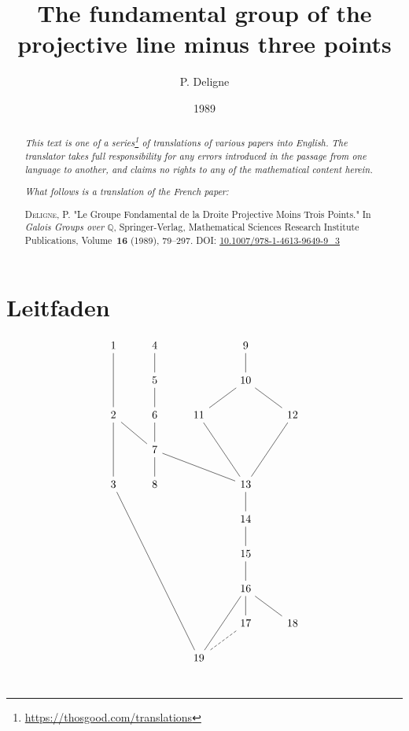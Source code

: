 \documentclass{article}
\title{The fundamental group of the projective line minus three points}
\author{P. Deligne}
\date{1989}
\newcommand{\doctype}{French paper}
\newcommand{\origcit}{%
  \textsc{Deligne, P.}
  "Le Groupe Fondamental de la Droite Projective Moins Trois Points."
  In \emph{Galois Groups over $\mathbb{Q}$}, Springer-Verlag, Mathematical Sciences Research Institute Publications, Volume~\textbf{16} (1989), 79--297.
  \textsc{DOI:} \href{https://doi.org/10.1007/978-1-4613-9649-9_3}{10.1007/978-1-4613-9649-9\_3}%
}
\theoremstyle{definition}
\begin{document}
\maketitle
\thispagestyle{fancy}

\renewcommand{\abstractname}{Translator's note.}

\begin{abstract}
  \renewcommand*{\thefootnote}{\fnsymbol{footnote}}
  \emph{This text is one of a series\footnote{\url{https://thosgood.com/translations}} of translations of various papers into English.}
  \emph{The translator takes full responsibility for any errors introduced in the passage from one language to another, and claims no rights to any of the mathematical content herein.}

  \medskip
  
  \emph{What follows is a translation of the \doctype:}

  \medskip\noindent
  \origcit
\end{abstract}

\setcounter{footnote}{0}

\tableofcontents
\bigskip




\section*{Leitfaden}
\[
  \begin{tikzcd}
    1 \ar[dd, no head] & 4 \ar[d, no head] & & 9 \ar[d, no head] &
  \\& 5 \ar[d, no head] & & 10 \ar[dl, no head] \ar[dr, no head] &
  \\2 \ar[dd, no head] \ar[dr, no head] & 6 \ar[d, no head] & 11 \ar[ddr, no head] & & 12 \ar[ddl, no head]
  \\& 7 \ar[d, no head] \ar[drr, no head] & & &
  \\3 \ar[dddddrr, no head] & 8 & & 13 \ar[d, no head] &
  \\ & & & 14 \ar[d, no head] &
  \\ & & & 15 \ar[d, no head] &
  \\ & & & 16 \ar[d, no head] \ar[dr, no head] \ar[ddl, no head] &
  \\ & & & 17 \ar[dl, no head, dashed] & 18
  \\ & & 19 & &
  \end{tikzcd}
\]


\section*{}
\end{document}
